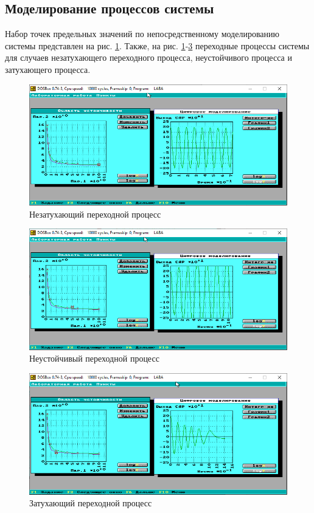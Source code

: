 	\subsection{Моделирование процессов системы}
	
	Набор точек предельных значений по непосредственному моделированию системы представлен на рис. \ref{mod1}. Также, на рис. \ref{mod1}-\ref{mod3} переходные процессы системы для случаев незатухающего переходного процесса, неустойчивого процесса и затухающего процесса.
	
	\begin{figure}
		\centering\includegraphics[width=.8\textwidth]{png/7.png}
		\caption{Незатухающий переходной процесс}
		\label{mod1}
	\end{figure}
	
	\begin{figure}
		\centering\includegraphics[width=.8\textwidth]{png/8.png}
		\caption{Неустойчивый переходной процесс}
		\label{mod2}
	\end{figure}
	
	\begin{figure}
		\centering\includegraphics[width=.8\textwidth]{png/9.png}
		\caption{Затухающий переходной процесс}
		\label{mod3}
	\end{figure}
	
